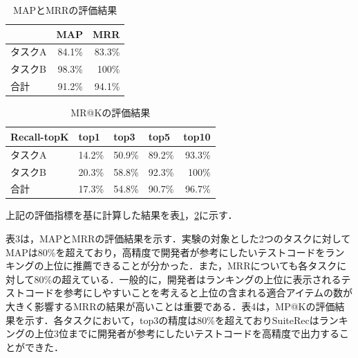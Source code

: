 \documentclass[12pt]{jarticle} %
\begin{document}
\newpage

\begin{table}[h]
\caption{MAPとMRRの評価結果}
\label{map}
\begin{center}
\begin{tabular}{|p{3cm}|p{3cm}|p{3cm}|}
\hline \hline
\multicolumn{1}{|r|}{} & \multicolumn{1}{p{3cm}|}{MAP} & \multicolumn{1}{p{3cm}|}{MRR} \\ \hline
タスクA & \multicolumn{1}{r|}{84.1\%} & \multicolumn{1}{r|}{83.3\%} \\ \hline
タスクB & \multicolumn{1}{r|}{98.3\%} & \multicolumn{1}{r|}{100\%} \\ \hline
合計 & \multicolumn{1}{r|}{91.2\%} & \multicolumn{1}{r|}{94.1\%} \\ \hline
\end{tabular}
\end{center}
\end{table}


\begin{table}[h]
\caption{MR@Kの評価結果}
\label{pre}
\begin{center}
\begin{tabular}{|p{3cm}|p{2cm}|p{2cm}|p{2cm}|p{2cm}|}
\hline \hline
Recall-topK & top1 & top3 & top5 & top10 \\ \hline
タスクA & \multicolumn{1}{r|}{14.2\%} & \multicolumn{1}{r|}{50.9\%} & \multicolumn{1}{r|}{89.2\%} & \multicolumn{1}{r|}{93.3\%} \\ \hline
タスクB & \multicolumn{1}{r|}{20.3\%} & \multicolumn{1}{r|}{58.8\%} & \multicolumn{1}{r|}{92.3\%} & \multicolumn{1}{r|}{100\%} \\ \hline
合計 & \multicolumn{1}{r|}{17.3\%} & \multicolumn{1}{r|}{54.8\%} & \multicolumn{1}{r|}{90.7\%} & \multicolumn{1}{r|}{96.7\%} \\ \hline
\end{tabular}
\end{center}
\end{table}

上記の評価指標を基に計算した結果を表\ref{map}，\ref{pre}に示す．

表3は，MAPとMRRの評価結果を示す．実験の対象とした2つのタスクに対してMAPは80\%を超えており，高精度で開発者が参考にしたいテストコードをランキングの上位に推薦できることが分かった．また，MRRについても各タスクに対して80\%の超えている．一般的に，開発者はランキングの上位に表示されるテストコードを参考にしやすいことを考えると上位の含まれる適合アイテムの数が大きく影響するMRRの結果が高いことは重要である．表4は，MP@Kの評価結果を示す．各タスクにおいて，top3の精度は80\%を超えており{\sf SuiteRec}はランキングの上位3位までに開発者が参考にしたいテストコードを高精度で出力することができた．
\end{document}
